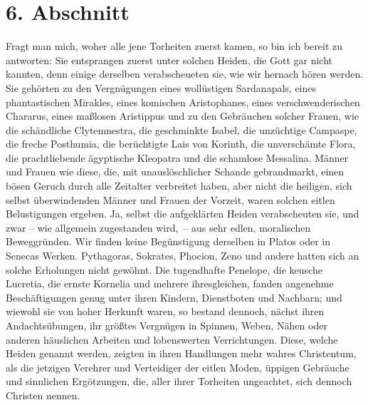 \section{6. Abschnitt} \label{kap17_ab6}

Fragt man mich, woher alle jene Torheiten zuerst kamen, so bin ich bereit zu
antworten: Sie entsprangen zuerst unter solchen Heiden, die Gott gar nicht
kannten, denn einige derselben verabscheueten sie, wie wir hernach hören werden.
Sie gehörten zu den Vergnügungen eines wollüstigen
Sardanapals, eines
phantastischen Mirakles, eines komischen
Aristophanes, eines verschwenderischen
Chararus, eines maßlosen
Aristippus und zu den Gebräuchen solcher Frauen, wie
die
schändliche Clytemnestra, die geschminkte
Isabel, die unzüchtige
Campaspe, die
freche Posthumia, die berüchtigte Lais von
Korinth, die unverschämte Flora, die
prachtliebende ägyptische Kleopatra und die schamlose
Messalina. Männer und
Frauen wie diese, die, mit unauslöschlicher Schande gebrandmarkt, einen bösen
Geruch durch alle Zeitalter verbreitet haben, aber nicht die heiligen, sich
selbst überwindenden Männer und
Frauen der Vorzeit, waren solchen eitlen
Belustigungen ergeben. Ja, selbst die aufgeklärten
Heiden verabscheuten sie,
und zwar -- wie allgemein zugestanden wird,~-- aus sehr edlen, moralischen
Beweggründen. Wir finden keine Begünstigung derselben in
Platos oder in
Senecas Werken. Pythagoras,
Sokrates, Phocion,
Zeno und andere hatten sich an
solche Erholungen nicht gewöhnt. Die tugendhafte
Penelope, die keusche
Lucretia, die ernste
Kornelia und mehrere ihresgleichen, fanden angenehme
Beschäftigungen genug unter ihren Kindern, Dienstboten und Nachbarn; und wiewohl
sie von hoher Herkunft waren, so bestand dennoch, nächst ihren Andachtsübungen,
ihr größtes Vergnügen in Spinnen, Weben, Nähen oder anderen häuslichen Arbeiten
und lobenswerten Verrichtungen. Diese, welche Heiden genannt werden, zeigten
in ihren Handlungen mehr wahres Christentum, als die jetzigen Verehrer und
Verteidiger der eitlen Moden, üppigen Gebräuche und sinnlichen Ergötzungen,
die, aller ihrer Torheiten ungeachtet, sich dennoch Christen nennen.

